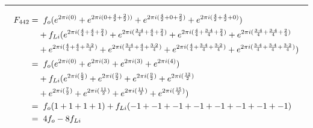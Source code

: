 \documentclass{article}
\begin{document}
\noindent\rule{12cm}{0.4pt}
\begin{align*}
	F_{442} =& \hspace{0.2cm}  f_{o}  (e^{2 \pi i (0)} 
	+ e^{2 \pi i (0 + \frac{4}{2} + \frac{2}{2}))} 
	+ e^{2 \pi i (\frac{4}{2} + 0 + \frac{2}{2})} 
	+ e^{2 \pi i (\frac{4}{2} + \frac{4}{2} + 0)})  \\
	&+ f_{Li} (e^{2 \pi i (\frac{4}{4} + \frac{4}{4} + \frac{2}{4})}  
	+ e^{2 \pi i (\frac{3 \cdot 4}{4} + \frac{4}{4} + \frac{2}{4})} 
	+ e^{2 \pi i (\frac{4}{4} + \frac{3 \cdot 4}{4} + \frac{2}{4})} 
	+ e^{2 \pi i (\frac{3 \cdot 4}{4} + \frac{3 \cdot 4}{4} + \frac{2}{4})} \\
	&+ e^{2 \pi i (\frac{4}{4} + \frac{4}{4} + \frac{3 \cdot 2}{4})}
	+ e^{2 \pi i (\frac{3 \cdot 4}{4} + \frac{4}{4} + \frac{3 \cdot 2}{4})} 
	+ e^{2 \pi i (\frac{4}{4} + \frac{3 \cdot 4}{4} + \frac{3 \cdot 2}{4})} 
	+ e^{2 \pi i (\frac{3 \cdot 4}{4} + \frac{3 \cdot 4}{4} + \frac{3 \cdot 2}{4})}) \\  
	=& \hspace{0.2cm}  f_{o}  (e^{2 \pi i (0)} 
	+ e^{2 \pi i (3)} 
	+ e^{2 \pi i (3)} 
	+ e^{2 \pi i (4)})  \\
	&+ f_{Li} (e^{2 \pi i (\frac{5}{2})}  
	+ e^{2 \pi i (\frac{9}{2})} 
	+ e^{2 \pi i (\frac{9}{2})} 
	+ e^{2 \pi i (\frac{13}{2})} \\
	&+ e^{2 \pi i (\frac{7}{2})}
	+ e^{2 \pi i (\frac{11}{2})} 
	+ e^{2 \pi i (\frac{11}{2})} 
	+ e^{2 \pi i (\frac{15}{2})}) \\
	=& \hspace{0.2cm}  f_{o}  (1  + 1 + 1 + 1) + f_{Li}(-1 + -1 + -1 + -1 + -1 + -1 + -1 + -1) \\
	=& \hspace{0.2cm} 4f_{o}   - 8f_{Li}
\end{align*}
\end{document}

